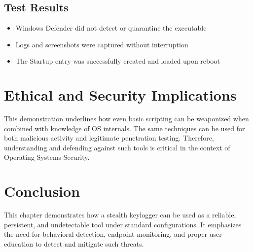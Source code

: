 \subsection{Test Results}
\begin{itemize}
    \item Windows Defender did not detect or quarantine the executable
    \item Logs and screenshots were captured without interruption
    \item The Startup entry was successfully created and loaded upon reboot
\end{itemize}

\section{Ethical and Security Implications}
This demonstration underlines how even basic scripting can be weaponized when combined with knowledge of OS internals. The same techniques can be used for both malicious activity and legitimate penetration testing. Therefore, understanding and defending against such tools is critical in the context of Operating Systems Security.

\section{Conclusion}
This chapter demonstrates how a stealth keylogger can be used as a reliable, persistent, and undetectable tool under standard configurations. It emphasizes the need for behavioral detection, endpoint monitoring, and proper user education to detect and mitigate such threats.
